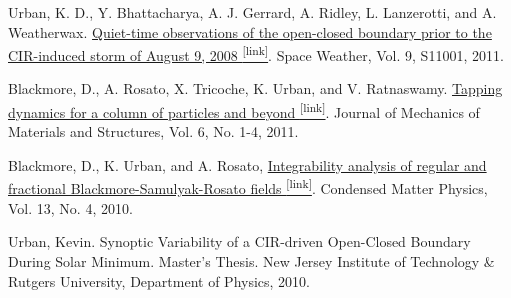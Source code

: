 \begin{itemize*}
  \item \label{sw-2011-quiet-time}
    Urban, K. D., Y. Bhattacharya, A. J. Gerrard, A. Ridley, L. Lanzerotti,
    and A. Weatherwax.
    \href{http://onlinelibrary.wiley.com/doi/10.1029/2011SW000688/full}{
    Quiet-time observations of the open-closed boundary prior to the CIR-induced storm of August 9, 2008 
    \textsuperscript{\tiny{[link]}}}.
    Space Weather, Vol. 9, S11001, 2011.

  \item \label{itm:gran-2011-tapping}
    Blackmore, D., A. Rosato, X. Tricoche, K. Urban, and V. Ratnaswamy.
    \href{http://msp.berkeley.edu/jomms/2011/6-1/jomms-v6-n1-p06-s.pdf}{
    Tapping dynamics for a column of particles and beyond
    \textsuperscript{\tiny{[link]}}}. 
    Journal of Mechanics of Materials and Structures, Vol. 6, No. 1-4, 2011.

  \item \label{itm:gran-2010-fractional}
    Blackmore, D., K. Urban, and A. Rosato,
    \href{http://www.icmp.lviv.ua/journal/zbirnyk.64/}{
    Integrability analysis of regular and fractional Blackmore-Samulyak-Rosato fields
    \textsuperscript{\tiny{[link]}}}.  
    Condensed Matter Physics, Vol. 13, No. 4, 2010. 

  \item \label{itm:sw-2010-masters}
    Urban, Kevin.
    Synoptic Variability of a {CIR}-driven Open-{C}losed Boundary During Solar Minimum.
    Master's Thesis. New Jersey Institute of Technology \& Rutgers University,
    Department of Physics, 2010.

\end{itemize*}
